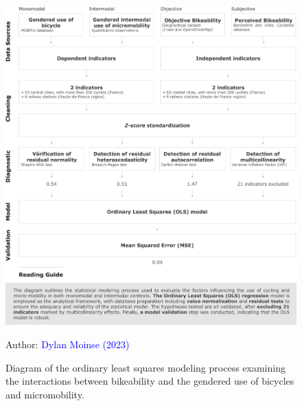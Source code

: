 \begin{refsegment}
\begin{figure}[h!]\vspace*{4pt}
    \caption{Diagram of the ordinary least squares modeling process examining the interactions between bikeability and the gendered use of bicycles and micromobility.}
    \label{fig-chap4:schema-methodologie-ols}
    \centerline{\includegraphics[width=1\columnwidth]{src/Figures/Chap-4/EN_Schema_Methodologie_OLS.pdf}}
    \vspace{5pt}
    \begin{flushright}\scriptsize{
    Author: \textcolor{blue}{Dylan Moinse (2023)}
    }\end{flushright}
\end{figure}


\end{refsegment}
